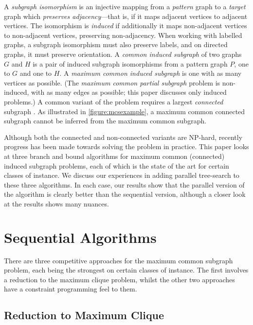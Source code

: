 \documentclass{llncs}
\begin{document}
A \emph{subgraph isomorphism} is an injective mapping from a \emph{pattern} graph to a \emph{target}
graph which \emph{preserves adjacency}---that is, if it maps adjacent vertices to adjacent vertices.
The isomorphism is \emph{induced} if additionally it maps non-adjacent vertices to non-adjacent vertices, preserving
non-adjacency. When working with labelled graphs, a subgraph isomorphism must also preserve labels, and
on directed graphs, it must preserve orientation. A \emph{common induced subgraph} of two graphs $G$
and $H$ is a pair of induced subgraph isomorphisms from a pattern graph $P$, one to $G$ and one to
$H$. A \emph{maximum common induced subgraph} is one with as many vertices as possible. (The
\emph{maximum common partial subgraph} problem is non-induced, with as many edges as
possible; this paper discusses only induced problems.)
A common variant of the problem requires a largest \emph{connected} subgraph
\cite{DBLP:journals/jcamd/RaymondW02a,DBLP:conf/mco/VismaraV08,o:EhrlichR11,o:LuoWSN17}.  As
illustrated in \cref{figure:mcsexample}, a maximum common connected subgraph cannot be inferred
from the maximum common subgraph.

Although both the connected and non-connected variants are NP-hard, recently progress has been made
towards solving the problem in practice.  This paper looks at three branch and bound algorithms for
maximum common (connected) induced subgraph problems, each of which is the state of the art for
certain classes of instance. We discuss our experiences in adding parallel tree-search to these
three algorithms. In each case, our results show that the parallel version of the algorithm is
clearly better than the sequential version, although a closer look at the results shows many
nuances.

\section{Sequential Algorithms}

There are three competitive approaches for the maximum common subgraph problem, each being the
strongest on certain classes of instance. The first involves a reduction to the maximum clique
problem, whilst the other two approaches have a constraint programming feel to them.

\subsection{Reduction to Maximum Clique}
\end{document}
